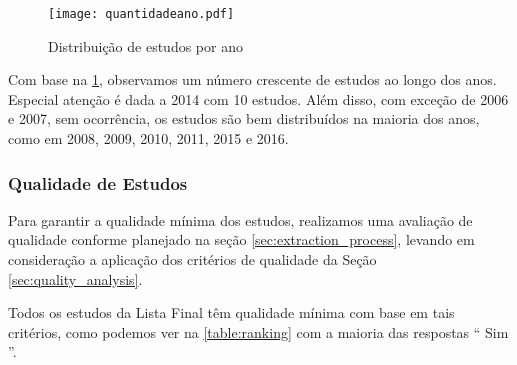 \begin{figure}[!ht]
	\centering
	\texttt{[image: quantidadeano.pdf]}
	\caption{Distribuição de estudos por ano}
	\label{fig:qtdano}
\end{figure}

Com base na \ref{fig:qtdano}, observamos um número crescente de estudos ao longo dos anos. Especial atenção é dada a 2014 com 10 estudos. Além disso, com exceção de 2006 e 2007, sem ocorrência, os estudos são bem distribuídos na maioria dos anos, como em 2008, 2009, 2010, 2011, 2015 e 2016.

\subsubsection{Qualidade de Estudos}

Para garantir a qualidade mínima dos estudos, realizamos uma avaliação de qualidade conforme planejado na seção \ref{sec:extraction_process}, levando em consideração a aplicação dos critérios de qualidade da Seção \ref{sec:quality_analysis}.

Todos os estudos da Lista Final têm qualidade mínima com base em tais critérios, como podemos ver na  \ref{table:ranking} com a maioria das respostas `` Sim ''.

